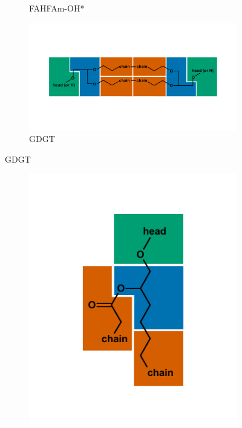 {\begin{figure}[h]
\begin{subfigure}[b]{.45\linewidth}
    	\caption{FAHFAm-OH*}
        \label{fig:FAHFAm-OH}
    \end{subfigure}
    \begin{subfigure}[b]{1\linewidth}
        \includegraphics[width=\linewidth]{figs_ch1/GDGT}
    	\caption{GDGT}
        \label{fig:GDGT}
    \end{subfigure}
    \end{figure}
\newpage
\begin{figure}[h]\ContinuedFloat
    \begin{subfigure}[b]{.45\linewidth}
    	\includegraphics[width=\linewidth]{figs_ch1/alkanediol}

\end{subfigure}
\end{figure}}
